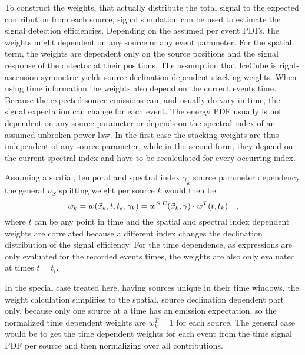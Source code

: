 To construct the weights, that actually distribute the total signal to the expected contribution from each source, signal simulation can be used to estimate the signal detection efficiencies.
Depending on the assumed per event PDFs, the weights might dependent on any source or any event parameter.
For the spatial term, the weights are dependent only on the source positions and the signal response of the detector at their positions.
The assumption that IceCube is right-ascension symmetric yields source declination dependent stacking weights.
When using time information the weights also depend on the current events time.
Because the expected source emissions can, and usually do vary in time, the signal expectation can change for each event.
The energy PDF usually is not dependent on any source parameter or depends on the spectral index of an assumed unbroken power law.
In the first case the stacking weights are thus independent of any source parameter, while in the second form, they depend on the current spectral index and have to be recalculated for every occurring index.

Assuming a spatial, temporal and spectral index $\gamma_k$ source parameter dependency the general $n_S$ splitting weight per source $k$ would then be
\begin{equation}
  w_k = w(\vec{x}_k, t, t_k, \gamma_k)
  = w^{S,E}(\vec{x}_k, \gamma) \cdot w^T(t, t_k)
  \quad\text{,}
\end{equation}
where $t$ can be any point in time and the spatial and spectral index dependent weights are correlated because a different index changes the declination distribution of the signal efficiency.
For the time dependence, as expressions are only evaluated for the recorded events times, the weights are also only evaluated at times $t=t_i$.

In the special case treated here, having sources unique in their time windows, the weight calculation simplifies to the spatial, source declination dependent part only, because only one source at a time has an emission expectation, so the normalized time dependent weights are $w_k^T = 1$ for each source.
The general case would be to get the time dependent weights for each event from the time signal PDF per source and then normalizing over all contributions.

